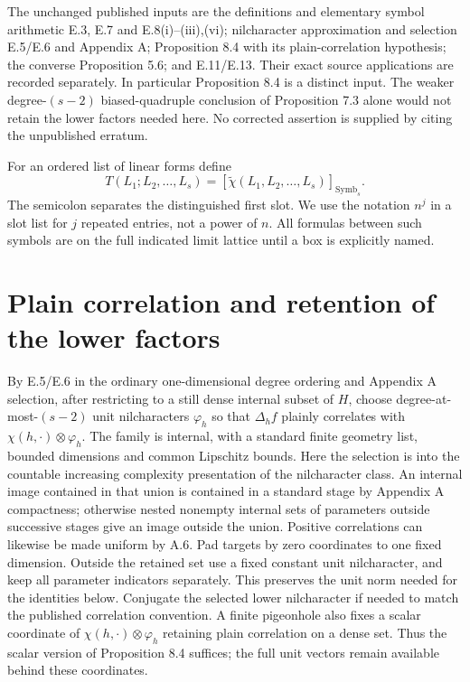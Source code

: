 \documentclass[11pt]{article}
\newcommand{\Symb}{\operatorname{Symb}}
\begin{document}
The unchanged published inputs are the definitions and elementary symbol
arithmetic E.3, E.7 and E.8(i)--(iii),(vi); nilcharacter approximation and
selection E.5/E.6 and Appendix A; Proposition 8.4 with its plain-correlation
hypothesis; the converse Proposition 5.6; and E.11/E.13. Their exact source
applications are recorded separately. In particular Proposition 8.4 is a
distinct input. The weaker degree-$(s-2)$ biased-quadruple conclusion of
Proposition 7.3 alone would not retain the lower factors needed here.
No corrected assertion is supplied by citing the unpublished erratum.

For an ordered list of linear forms define
\[
 T(L_1;L_2,\ldots,L_s)=[\widetilde\chi(L_1,L_2,\ldots,L_s)]_{\Symb_s}.
\]
The semicolon separates the distinguished first slot. We use the notation
$n^j$ in a slot list for $j$ repeated entries, not a power of $n$.
All formulas between such symbols are on the full indicated limit lattice
until a box is explicitly named.

\section{Plain correlation and retention of the lower factors}
By E.5/E.6 in the ordinary one-dimensional degree ordering and Appendix A
selection, after restricting to a still dense
internal subset of $H$, choose degree-at-most-$(s-2)$ unit nilcharacters
$\varphi_h$ so that $\Delta_hf$ plainly correlates with
$\chi(h,\cdot)\otimes\varphi_h$. The family is internal, with a standard
finite geometry list, bounded dimensions and common Lipschitz bounds.
Here the selection is into the countable increasing complexity presentation
of the nilcharacter class. An internal image contained in that union is
contained in a standard stage by Appendix A compactness; otherwise nested
nonempty internal sets of parameters outside successive stages give an
image outside the union. Positive correlations can likewise be made
uniform by A.6. Pad targets by zero coordinates to one fixed dimension.
Outside the retained set use a fixed constant unit nilcharacter, and keep
all parameter indicators separately. This preserves the unit norm needed
for the identities below.
Conjugate the selected lower nilcharacter if needed to match the published
correlation convention. A finite pigeonhole also fixes a scalar coordinate
of $\chi(h,\cdot)\otimes\varphi_h$ retaining plain correlation on a dense
set. Thus the scalar version of Proposition 8.4 suffices; the full unit
vectors remain available behind these coordinates.
\end{document}
